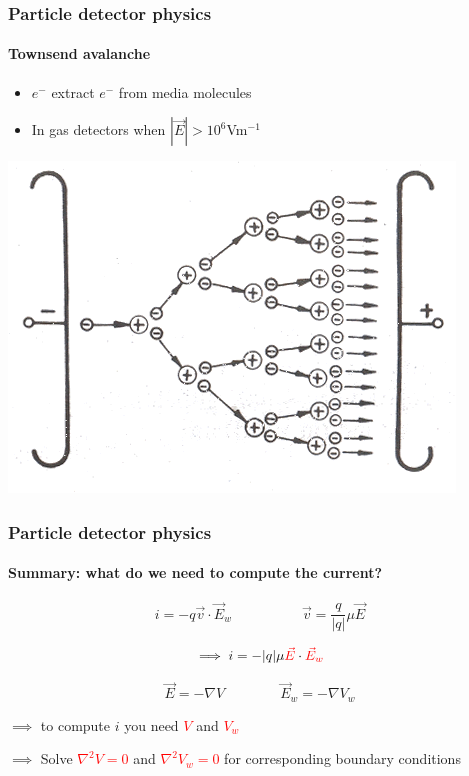 \documentclass[14pt]{beamer}
\begin{document}
\begin{frame}
  \frametitle{Particle detector physics}
  \framesubtitle{Townsend avalanche}

\begin{itemize}
 \item $e^{-}$ extract $e^{-}$ from media molecules
 \item In gas detectors when $|\vec{E}| > 10^6$Vm$^{-1}$
\end{itemize}

\begin{center}
\includegraphics[scale=0.35,angle=90]{images/townsend_avalanche.png}
\end{center}

\end{frame}

\begin{frame}
  \frametitle{Particle detector physics}
  \framesubtitle{Summary: what do we need to compute the current?}

  \vspace{-2em}


\[i = -q \vec{v} \cdot \vec{E}_w \qquad \qquad \quad \vec{v} = \frac{q}{|q|} \mu \vec{E}\]

\[\implies i = - |q| \mu \textcolor{red}{\vec{E}} \cdot \textcolor{red}{\vec{E}_w}\]

\[\vec{E} = -\nabla V \qquad \qquad \vec{E}_w = -\nabla V_w\]

\vspace{1em}

$\implies$ to compute $i$ you need \textcolor{red}{$V$} and \textcolor{red}{$V_w$}

$\implies$ Solve \textcolor{red}{$\nabla^2 V = 0$} and
\textcolor{red}{$\nabla^2 V_w = 0$} for corresponding boundary conditions

\end{frame}
\end{document}
